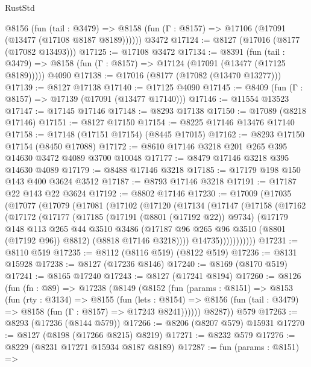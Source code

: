 \begin{lexlean}{RustStd}
\begin{coremodule}
    @8156
      (fun (tail : @3479) =>
      @8158 (fun (Γ : @8157) => @17106 (@17091 (@13477 (@17108 @8187 @8189))))))
    @3472
@17124 := @8127 (@17016 (@8177 (@17082 @13493)))
@17125 := @17108 @3472
@17134 := @8391
    (fun (tail : @3479) => @8158 (fun (Γ : @8157) => @17124 (@17091 (@13477 (@17125 @8189)))))
    @4090
@17138 := @17016 (@8177 (@17082 (@13470 @13277)))
@17139 := @8127 @17138
@17140 := @17125 @4090
@17145 := @8409 (fun (Γ : @8157) => @17139 (@17091 (@13477 @17140)))
@17146 := @11554 @13523
@17147 := @17145 @17146
@17148 := @8293 @17138
@17150 := @17089 (@8218 @17146)
@17151 := @8127 @17150
@17154 := @8225 @17146 @13476 @17140
@17158 := @17148 (@17151 @17154) (@8445 @17015)
@17162 := @8293 @17150 @17154 (@8450 @17088)
@17172 := @8610 @17146 @3218 @201 @265 @395 @14630 @3472 @4089 @3700 @10048
@17177 := @8479 @17146 @3218 @395 @14630 @4089
@17179 := @8488 @17146 @3218
@17185 := @17179 @198 @150 @143 @400 @3624 @3512
@17187 := @8793 @17146 @3218
@17191 := @17187 @22 @143 @22 @3624
@17192 := @8802 @17146
@17230 := @17009
    (@17035
      (@17077
        (@17079
          (@17081
            (@17102
              (@17120
                (@17134
                  (@17147
                    (@17158
                      (@17162
                        (@17172
                          (@17177
                            (@17185
                              (@17191 (@8801 (@17192 @22)) @9734)
                              (@17179
                                @148
                                @113
                                @265
                                @44
                                @3510
                                @3486
                                (@17187 @96 @265 @96 @3510 (@8801 (@17192 @96)) @8812)
                                (@8818 @17146 @3218))))
                          @14735)))))))))))
@17231 := @8110 @519
@17235 := @8112 (@8116 @519) (@8122 @519)
@17236 := @8131 @15928
@17238 := @8127 (@17236 @8146)
@17240 := @8169 (@8170 @519)
@17241 := @8165 @17240
@17243 := @8127 (@17241 @8194)
@17260 := @8126
    (fun (fn : @89) =>
    @17238
      (@8149
        (@8152
          (fun (params : @8151) =>
          @8153
            (fun (rty : @3134) =>
            @8155
              (fun (lets : @8154) =>
              @8156 (fun (tail : @3479) => @8158 (fun (Γ : @8157) => @17243 @8241))))))
        @8287))
    @579
@17263 := @8293 (@17236 (@8144 @579))
@17266 := @8206 (@8207 @579) @15931
@17270 := @8127 (@8198 (@17266 @8215) @8219)
@17271 := @8232 @579
@17276 := @8229 (@8231 @17271 @15934 @8187 @8189)
@17287 := fun (params : @8151) =>

\end{coremodule}
\end{lexlean}
